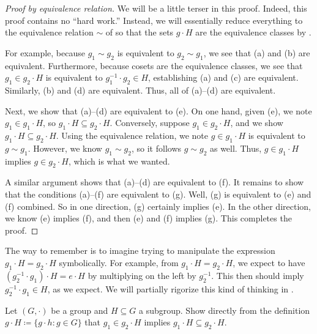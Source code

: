 \documentclass[../notes.tex]{subfiles}
\begin{document}
\begin{proof}[Proof by equivalence relation]
    We will be a little terser in this proof. Indeed, this proof contains no ``hard work.'' Instead, we will essentially reduce everything to the equivalence relation $\sim$ of  so that the sets $g\cdot H$ are the equivalence classes by .

    For example, because $g_1\sim g_2$ is equivalent to $g_2\sim g_1$, we see that (a) and (b) are equivalent. Furthermore, because cosets are the equivalence classes, we see that $g_1\in g_2\cdot H$ is equivalent to $g_1^{-1}\cdot g_2\in H$, establishing (a) and (c) are equivalent. Similarly, (b) and (d) are equivalent. Thus, all of (a)--(d) are equivalent.
    
    Next, we show that (a)--(d) are equivalent to (e). On one hand, given (e), we note $g_1\in g_1\cdot H$, so $g_1\cdot H\subseteq g_2\cdot H$. Conversely, suppose $g_1\in g_2\cdot H$, and we show $g_1\cdot H\subseteq g_2\cdot H$. Using the equivalence relation, we note $g\in g_1\cdot H$ is equivalent to $g\sim g_1$. However, we know $g_1\sim g_2$, so it follows $g\sim g_2$ as well. Thus, $g\in g_1\cdot H$ implies $g\in g_2\cdot H$, which is what we wanted.
    
    A similar argument shows that (a)--(d) are equivalent to (f). It remains to show that the conditions (a)--(f) are equivalent to (g). Well, (g) is equivalent to (e) and (f) combined. So in one direction, (g) certainly implies (e). In the other direction, we know (e) implies (f), and then (e) and (f) implies (g). This completes the proof.
\end{proof}
\begin{remark} \label{rem:unjustified-manip}
    The way to remember  is to imagine trying to manipulate the expression $g_1\cdot H=g_2\cdot H$ symbolically. For example, from $g_1\cdot H=g_2\cdot H$, we expect to have $\left(g_2^{-1}\cdot g_1\right)\cdot H=e\cdot H$ by multiplying on the left by $g_2^{-1}$. This then should imply $g_2^{-1}\cdot g_1\in H$, as we expect. We will partially rigorize this kind of thinking in .
\end{remark}
\begin{exe}
    Let $(G,\cdot)$ be a group and $H\subseteq G$ a subgroup. Show directly from the definition $g\cdot H\coloneqq\{g\cdot h:g\in G\}$ that $g_1\in g_2\cdot H$ implies $g_1\cdot H\subseteq g_2\cdot H$.
\end{exe}
\end{document}
